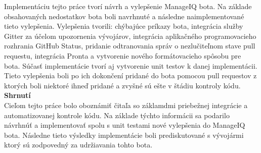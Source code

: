 \indent Implementáciu tejto práce tvorí návrh a vylepšenie ManageIQ bota. Na základe obsahovaných nedostatkov bota boli navrhnuté a následne naimplementované tieto vylepšenia. Vylepšenia tvorili: chýbajúce príkazy bota, integrácia služby Gitter za účelom upozornenia vývojárov, integrácia aplikačného programovacieho rozhrania GitHub Status, pridanie odtranovania správ o nezlučiteľnom stave pull requestu, integrácia Pronta a vytvorenie nového formátovacieho spôsobu pre bota. Súčasť implementácie tvorí aj vytvorenie unit testov k danej implementácii. Tieto vylepšenia boli po ich dokončení pridané do bota pomocou pull requestov z ktorých boli niektoré ihneď pridané a zvyšné sú ešte v štádiu kontroly kódu.\\[0.25em]
\textbf{Shrnutí}\\[0.25em]
Cieľom tejto práce bolo oboznámiť čitaľa so záklamdmi priebežnej integrácie a automatizovanej kontrole kódu. Na základe týchto informácii sa podarilo návrhnúť a implementovať spolu s unit testami nové vylepšenia do ManageIQ bota. Následne tieto výsledky implementácie boli prediskutované s vývojármi ktorý sú zodpovedný za udržiavania tohto bota.

